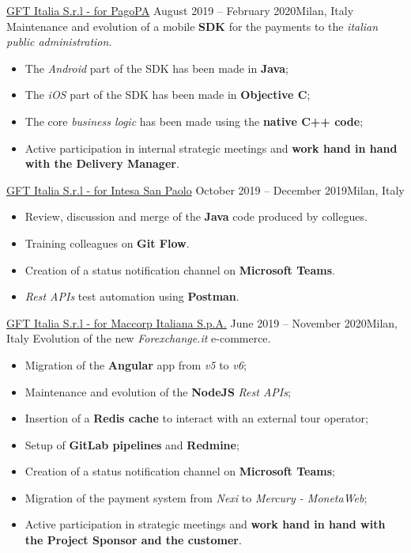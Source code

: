 \documentclass[10pt,a4paper]{altacv}
\begin{document}
\begin{adjustwidth}{0cm}{-8cm}
\divider

{\href{https://www.pagopa.gov.it/}{GFT Italia S.r.l - for PagoPA}}
{August 2019 -- February 2020}{Milan, Italy}
Maintenance and evolution of a mobile \textbf{SDK} for the payments to the \textit{italian public administration}.
\newline
\begin{itemize}
	\item The \textit{Android} part of the SDK has been made in \textbf{Java};
	\item The \textit{iOS} part of the SDK has been made in \textbf{Objective C};
	\item The core \textit{business logic} has been made using the \textbf{native C++ code};
	\item Active participation in internal strategic meetings and \textbf{work hand in hand with the Delivery Manager}.
\end{itemize}

\divider

{\href{https://www.intesasanpaolo.com/}{GFT Italia S.r.l - for Intesa San Paolo}}
{October 2019 -- December 2019}{Milan, Italy}
\begin{itemize}
	\item Review, discussion and merge of the \textbf{Java} code produced by collegues.
	\item Training colleagues on \textbf{Git Flow}.
	\item Creation of a status notification channel on \textbf{Microsoft Teams}.
	\item \textit{Rest APIs} test automation using \textbf{Postman}.
\end{itemize}

\divider

{\href{https://www.forexchange.it/}{GFT Italia S.r.l - for Maccorp Italiana S.p.A.}}
{June 2019 -- November 2020}{Milan, Italy}
Evolution of the new \textit{Forexchange.it} e-commerce.
\newline 
\begin{itemize}
	\item Migration of the \textbf{Angular} app from \textit{v5} to \textit{v6};
	\item Maintenance and evolution of the \textbf{NodeJS} \textit{Rest APIs};
	\item Insertion of a \textbf{Redis cache} to interact with an external tour operator;
	\item Setup of \textbf{GitLab pipelines} and \textbf{Redmine};
	\item Creation of a status notification channel on \textbf{Microsoft Teams};
	\item Migration of the payment system from \textit{Nexi} to \textit{Mercury - MonetaWeb};
	\item Active participation in strategic meetings and \textbf{work hand in hand with the Project Sponsor and the customer}.
\end{itemize}


\end{adjustwidth}
\end{document}
